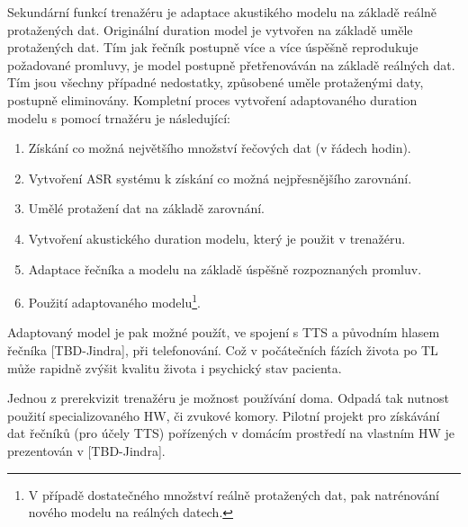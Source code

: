 Sekundární funkcí trenažéru je adaptace akustikého modelu na základě reálně protažených dat. Originální duration model je vytvořen na základě uměle protažených dat. Tím jak řečník postupně více a více úspěšně reprodukuje požadované promluvy, je model postupně přetřenováván na základě reálných dat. Tím jsou všechny případné nedostatky, způsobené uměle protaženými daty, postupně eliminovány. Kompletní proces vytvoření adaptovaného duration modelu s pomocí trnažéru je následující:

\begin{enumerate}
  \item Získání co možná největšího množství řečových dat (v řádech hodin).
  \item Vytvoření ASR systému k získání co možná nejpřesnějšího zarovnání.
  \item Umělé protažení dat na základě zarovnání.
  \item Vytvoření akustického duration modelu, který je použit v trenažéru.
  \item Adaptace řečníka a modelu na základě úspěšně rozpoznaných promluv.
  \item Použití adaptovaného modelu\footnote{V případě dostatečného množství reálně protažených dat, pak natrénování nového modelu na reálných datech.}.
\end{enumerate}

\noindent Adaptovaný model je pak možné použít, ve spojení s TTS a původním hlasem řečníka [TBD-Jindra], při telefonování. Což v počátečních fázích života po TL může rapidně zvýšit kvalitu života i psychický stav pacienta.

Jednou z prerekvizit trenažéru je možnost používání doma. Odpadá tak nutnost použití specializovaného HW, či zvukové komory. Pilotní projekt pro získávání dat řečníků (pro účely TTS) pořízených v domácím prostředí na vlastním HW je prezentován v [TBD-Jindra].




